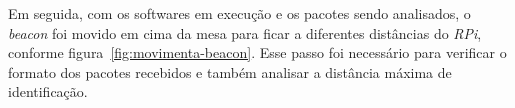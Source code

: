\documentclass[
	12pt,				%
	openright,			%
	oneside,			%
	a4paper,			%
	chapter=TITLE,		%
	english,			%
	brazil				%
	]{abntex2}
\begin{document}
{\begin{figure}[h!]
\end{figure}

\begin{figure}[h!]
\end{figure}

Em seguida, com os softwares em execução e os pacotes sendo analisados, o \textit{beacon} foi movido em cima da mesa para ficar a diferentes distâncias do \textit{RPi}, conforme figura~\ref{fig:movimenta-beacon}. Esse passo foi necessário para verificar o formato dos pacotes recebidos e também analisar a distância máxima de identificação.

}
\end{document}
